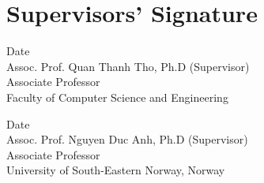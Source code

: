 \newpage

\section*{\Huge Supervisors' Signature}

\vspace{2cm}
\noindent\blank{8cm}Date\blank{4cm}\\
Assoc. Prof. Quan Thanh Tho, Ph.D (Supervisor)\\
Associate Professor\\
Faculty of Computer Science and Engineering

\vspace{5cm}
\noindent\blank{8cm}Date\blank{4cm}\\
Assoc. Prof. Nguyen Duc Anh, Ph.D (Supervisor)\\
Associate Professor\\
University of South-Eastern Norway, Norway
